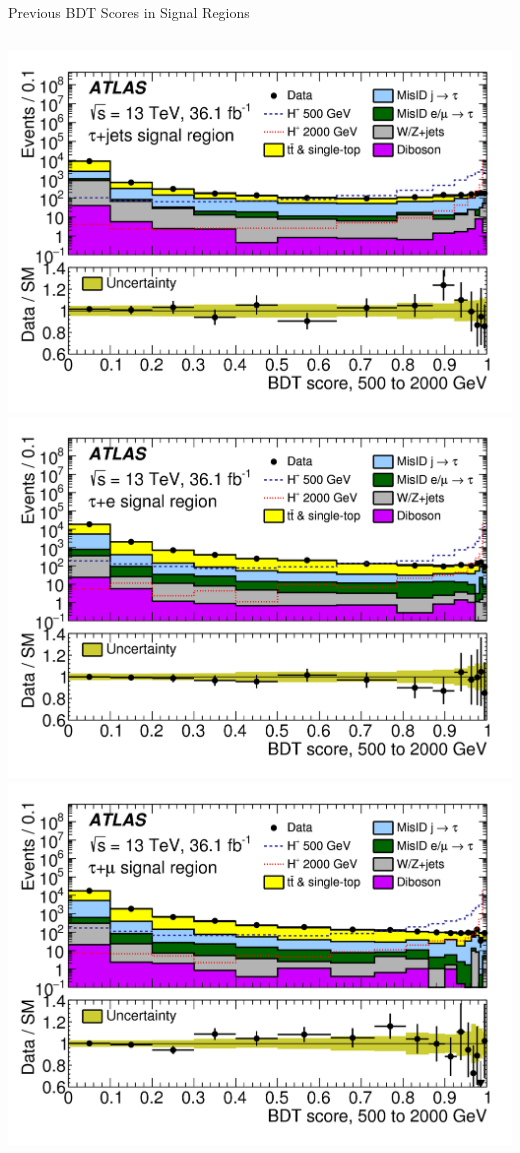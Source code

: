 \documentclass[aspectratio=169,xcolor=table]{beamer}
\begin{document}
\begin{frame}{Previous BDT Scores in Signal Regions}
\begin{columns}
          \includegraphics[height=.24\textheight,keepaspectratio=true]{taujet_SR_2018/taujet_SR_500to2000_2018.png}
          \includegraphics[height=.24\textheight,keepaspectratio=true]{tauel_SR_2018/tauel_SR_500to2000_2018.png}
          \includegraphics[height=.24\textheight,keepaspectratio=true]{taumu_SR_2018/taumu_SR_500to2000_2018.png}
        \end{columns}
      \end{frame}
\end{document}
